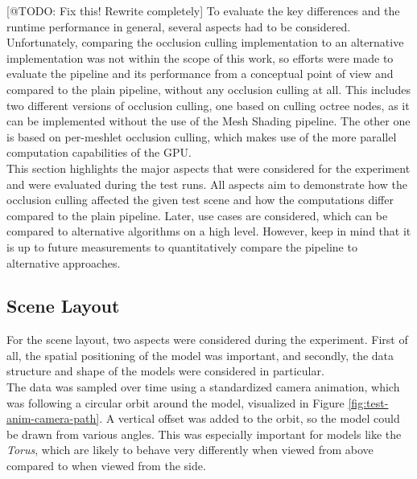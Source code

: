 [@TODO: Fix this! Rewrite completely]
To evaluate the key differences and the runtime performance in general, several aspects had to be considered.
Unfortunately, comparing the occlusion culling implementation to an alternative implementation was not within the 
scope of this work, so efforts were made to evaluate the pipeline and its performance from a conceptual point of 
view and compared to the plain pipeline, without any occlusion culling at all. This includes two different 
versions of occlusion culling, one based on culling octree nodes, as it can be implemented without the use of the 
Mesh Shading pipeline. The other one is based on per-meshlet occlusion culling, which makes use of the more parallel 
computation capabilities of the \ac{GPU}. \\

This section highlights the major aspects that were considered for the experiment and were evaluated during the 
test runs. All aspects aim to demonstrate how the occlusion culling affected the given test scene and how the 
computations differ compared to the plain pipeline. Later, use cases are considered, which can be compared to 
alternative algorithms on a high level. However, keep in mind that it is up to future measurements to quantitatively 
compare the pipeline to alternative approaches. 


\subsection*{Scene Layout} \label{subsec-scene-layout}

For the scene layout, two aspects were considered during the experiment. First of all, the spatial positioning 
of the model was important, and secondly, the data structure and shape of the models were considered in particular. \\

\noindent
The data was sampled over time using a standardized camera animation, which was following a circular orbit 
around the model, visualized in Figure \ref{fig:test-anim-camera-path}. A vertical offset was added to the orbit, 
so the model could be drawn from various angles. This was especially important for models like the \emph{Torus}, 
which are likely to behave very differently when viewed from above compared to when viewed from the side.

